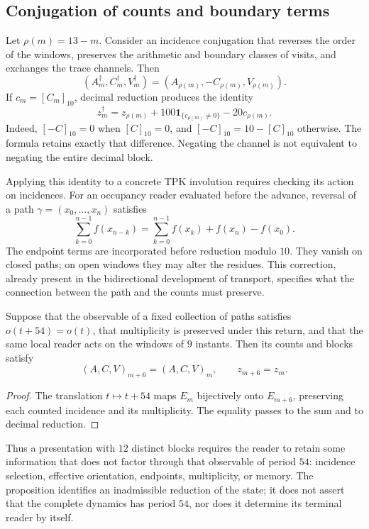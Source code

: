 \subsection{Conjugation of counts and boundary terms}
\label{subsec:registro-conjugacion-incidencial}

Let \(\rho(m)=13-m\). Consider an incidence conjugation
that reverses the order of the windows, preserves the arithmetic and
boundary classes of visits, and exchanges the trace channels.
Then
\[
 (A_m^\dagger,C_m^\dagger,V_m^\dagger)
 =(A_{\rho(m)},-C_{\rho(m)},V_{\rho(m)}).
\]
If \(c_m=[C_m]_{10}\), decimal reduction produces the identity
\begin{equation}
 z_m^\dagger=z_{\rho(m)}
       +100\mathbf1_{\{c_{\rho(m)}\ne0\}}-20c_{\rho(m)}.
 \label{eq:registro-conjugacion-decimal}
\end{equation}
Indeed, \([-C]_{10}=0\) when \([C]_{10}=0\), and
\([-C]_{10}=10-[C]_{10}\) otherwise. The formula retains
exactly that difference. Negating the channel is not equivalent to negating
the entire decimal block.

Applying this identity to a concrete TPK involution requires
checking its action on incidences. For an occupancy reader
evaluated before the advance, reversal of a path
\(\gamma=(x_0,\ldots,x_n)\) satisfies
\[
 \sum_{k=0}^{n-1}f(x_{n-k})
 =\sum_{k=0}^{n-1}f(x_k)+f(x_n)-f(x_0).
\]
The endpoint terms are incorporated before reduction modulo
\(10\). They vanish on closed paths; on open windows they may
alter the residues. This correction, already present in the bidirectional
development of transport, specifies what the connection
between the path and the counts must preserve.

\begin{proposition}
Suppose that the observable of a fixed collection of paths satisfies
\(o(t+54)=o(t)\), that multiplicity is preserved under this return,
and that the same local reader acts on the windows of \(9\) instants.
Then its counts and blocks satisfy
\[
 (A,C,V)_{m+6}=(A,C,V)_m,\qquad z_{m+6}=z_m.
\]
\end{proposition}

\begin{proof}
The translation \(t\mapsto t+54\) maps \(E_m\) bijectively
onto \(E_{m+6}\), preserving each counted incidence and its multiplicity.
The equality passes to the sum and to decimal reduction.
\end{proof}

Thus a presentation with \(12\) distinct blocks requires the
reader to retain some information that does not factor through that observable
of period \(54\): incidence selection, effective orientation,
endpoints, multiplicity, or memory. The proposition identifies an inadmissible
reduction of the state; it does not assert that the complete dynamics has
period \(54\), nor does it determine its terminal reader by itself.
